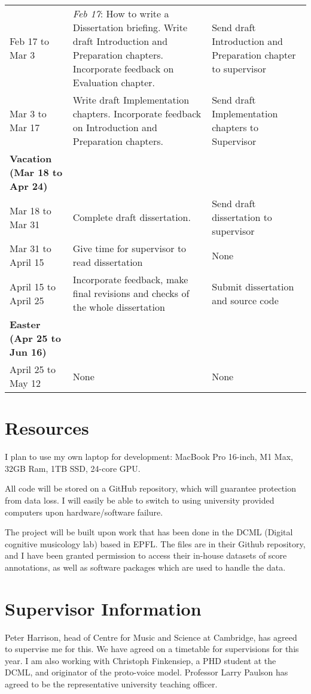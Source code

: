 \documentclass{article}
\begin{document}
{\begin{tabularx}{\textwidth}{@{} p{125pt} X p{110pt} @{}}
  Feb 17 to Mar 3 & \textit{Feb 17}: How to write a Dissertation briefing. Write draft Introduction and Preparation chapters. Incorporate feedback on Evaluation chapter. &Send draft Introduction and Preparation chapter to supervisor       \\
  Mar 3 to Mar 17 & Write draft Implementation chapters. Incorporate feedback on Introduction and Preparation chapters.& Send draft Implementation chapters to Supervisor       \\
  \midrule
  \bfseries{Vacation} (Mar 18 to Apr 24)  & &    \\ 
  Mar 18 to Mar 31 & Complete draft dissertation. & Send draft dissertation to supervisor       \\
  Mar 31 to April 15 & Give time for supervisor to read dissertation & None \\
  April 15 to April 25 & Incorporate feedback, make final revisions and checks of the whole dissertation & Submit dissertation and source code\\
  \midrule
  \bfseries{Easter} (Apr 25 to Jun 16)  &  &    \\ 
   April 25 to May 12 & None      & None             \\ 
  \bottomrule
\end{tabularx}}
\section{Resources}
I plan to use my own laptop for development: MacBook Pro 16-inch, M1 Max, 32GB Ram, 1TB SSD, 24-core GPU.

All code will be stored on a GitHub repository, which will guarantee protection from data loss. I will easily be able to switch to using university provided computers upon hardware/software failure.

The project will be built upon work that has been done in the DCML (Digital cognitive musicology lab) based in EPFL. The files are in their Github repository, and I have been granted permission to access their in-house datasets of score annotations, as well as software packages which are used to handle the data.
  
\section{Supervisor Information} 
Peter Harrison, head of Centre for Music and Science at Cambridge, has agreed to supervise me for this. 
We have agreed on a timetable for supervisions for this year. I am also working with Christoph Finkensiep, a PHD student at the DCML, and originator of the proto-voice model.
Professor Larry Paulson has agreed to be the representative university teaching officer.

% 
% 
\end{document}

